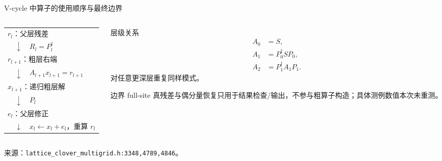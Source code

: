 \documentclass[UTF8,aspectratio=169,11pt]{ctexbeamer}
\newcommand{\source}[1]{%
  \vspace{-0.08em}\par{\raggedright\scriptsize\color{muted}来源：#1\par}}
\newcommand{\src}[1]{\nolinkurl{#1}}
\begin{document}
\begin{frame}[t]{V-cycle 中算子的使用顺序与最终边界}
  \begin{columns}[T,totalwidth=\textwidth]
    \begin{column}{0.52\textwidth}
      \begin{tabular}{@{}l@{}}
        $r_l$：父层残差 \\
        $\quad\downarrow\quad R_l=P_l^\dagger$ \\
        $r_{l+1}$：粗层右端 \\
        $\quad\downarrow\quad A_{l+1}x_{l+1}=r_{l+1}$ \\
        $x_{l+1}$：递归粗层解 \\
        $\quad\downarrow\quad P_l$ \\
        $e_l$：父层修正 \\
        $\quad\downarrow\quad x_l\leftarrow x_l+e_l$，重算 $r_l$
      \end{tabular}
    \end{column}
    \begin{column}{0.44\textwidth}
      \begin{block}{层级关系}
        \small
        \begin{align*}
          A_0&=S,\\
          A_1&=P_0^\dagger S P_0,\\
          A_2&=P_1^\dagger A_1P_1.
        \end{align*}
        对任意更深层重复同样模式。
      \end{block}
      \begin{block}{边界}
        \footnotesize
        full-site 真残差与偶分量恢复只用于结果检查/输出，不参与粗算子构造；具体测例数值本次未重测。
      \end{block}
    \end{column}
  \end{columns}
  \source{\src{lattice_clover_multigrid.h:3348,4789,4846}。}
\end{frame}
\end{document}
